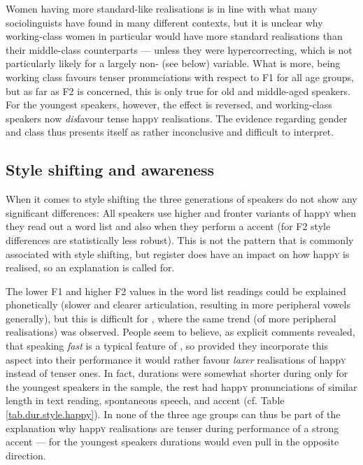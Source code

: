 Women having more standard-like realisations is in line with what many sociolinguists have found in many different contexts, but it is unclear why working-class women in particular would have more standard realisations than their middle-class counterparts --- unless they were hypercorrecting, which is not particularly likely for a largely non- (see below) variable.
What is more, being working class favours tenser pronunciations with respect to F1 for all age groups, but as far as F2 is concerned, this is only true for old and middle-aged speakers.
For the youngest speakers, however, the effect is reversed, and working-class speakers now \emph{dis}favour tense happ\textsc{y} realisations.
The evidence regarding gender and class thus presents itself as rather inconclusive and difficult to interpret.

\subsection{Style shifting and awareness}
\label{prod.disc.happy.style}

When it comes to style shifting the three generations of speakers do not show any significant differences: All speakers use higher and fronter variants of happ\textsc{y} when they read out a word list and also when they perform a   accent (for F2 style differences are statistically less robust).
This is not the pattern that is commonly associated with  style shifting, but register does have an impact on how happ\textsc{y} is realised, so an explanation is called for.

The lower F1 and higher F2 values in the word list readings could be explained phonetically (slower and clearer articulation, resulting in more peripheral vowels generally), but this is difficult for , where the same trend (of more peripheral realisations) was observed.
People seem to believe, as explicit comments revealed, that speaking \emph{fast} is a typical feature of , so provided they incorporate this aspect into their  performance it would rather favour \emph{laxer} realisations of happ\textsc{y} instead of tenser ones.
In fact,  durations were somewhat shorter during  only for the youngest speakers in the sample, the rest had happ\textsc{y} pronunciations of similar length in text reading, spontaneous speech, and accent  (cf. Table \ref{tab.dur.style.happy}).
In none of the three age groups can  thus be part of the explanation why happ\textsc{y} realisations are tenser during performance of a strong  accent --- for the youngest speakers durations would even pull in the opposite direction.

